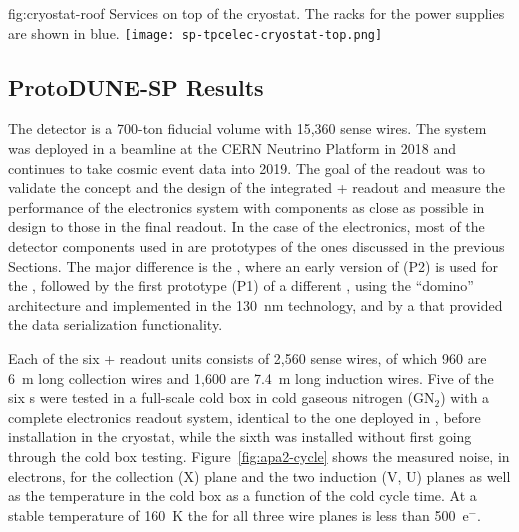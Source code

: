 \begin{dunefigure}
{fig:cryostat-roof}
{Services on top of the cryostat. The racks for the  power supplies are shown in blue.}
\texttt{[image: sp-tpcelec-cryostat-top.png]}
\end{dunefigure}

\subsection{ProtoDUNE-SP Results}
\label{sec:fdsp-tpcelec-overview-pdune}

The  detector is a 700-ton fiducial volume
 with 15,360 sense wires. 
The system was deployed in a beamline at the CERN Neutrino Platform 
in 2018 and continues to take cosmic event data into 2019. The goal of 
the   readout was to validate the concept 
and the design of the integrated + readout 
and measure the performance of the  electronics system with components 
as close as possible in design to those in the final   readout.
In the case of the  electronics, most of the detector components 
used in  are prototypes of the  ones discussed in the 
previous Sections. The major difference is the , where an
early version of  (P2) is used for the , followed
by the first prototype (P1) of a different , using the ``domino'' architecture 
and implemented in the \SI{130}{nm} technology, and by
a  that provided the data serialization functionality.

Each of the six  +
readout units consists of 2,560 sense wires, of which 960 are \SI{6}{m} 
long collection wires and 1,600 are \SI{7.4}{m} long induction wires. 
Five of the six s were tested in a full-scale cold box in 
cold gaseous nitrogen (GN$_2$) with a complete  electronics readout system,  
identical to the one %
deployed in , before installation in the cryostat,
while the sixth %
 was installed without first going through the cold
box testing. Figure~\ref{fig:apa2-cycle} shows the measured noise, in 
electrons, for the collection (X) plane and the two induction (V, U) 
planes as well as the  temperature in the cold box as a 
function of the cold cycle time. At a stable temperature of 
\SI{160}{K} the  for all three wire planes is less than 500~e$^-$.

